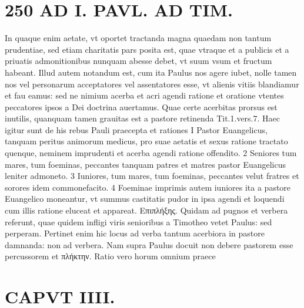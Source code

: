 \documentclass{article}
\begin{document}
\begin{pages}
\section*{250 AD I. PAVL. AD TIM. }\pstart In quaque enim aetate, vt oportet tractanda magna quaedam non tantum prudentiae, sed etiam charitatis pars posita est, quae vtraque et a publicis et a priuatis admonitionibus nunquam abesse debet, vt suum vsum et fructum habeant. Illud autem notandum est, cum ita Paulus nos agere iubet, nolle tamen nos vel personarum acceptatores vel assentatores esse, vt alienis vitiis blandiamur et fau eamus: sed ne nimium acerba et acri agendi ratione et oratione vtentes peccatores ipsos a Dei doctrina auertamus. Quae certe acerbitas prorsus est inutilis, quanquam tamen grauitas est a pastore retinenda Tit.1.vers.7. Haec igitur sunt de his rebus Pauli praecepta et rationes I Pastor Euangelicus, tanquam peritus animorum medicus, pro suae aetatis et sexus ratione tractato quenque, neminem imprudenti et acerba agendi ratione offendito. 2 Seniores tum mares, tum foeminas, peccantes tanquam patres et matres pastor Euangelicus leniter admoneto. 3 Iuniores, tum mares, tum foeminas, peccantes velut fratres et sorores idem commonefacito. 4 Foeminae imprimis autem iuniores ita a pastore Euangelico moneantur, vt summus castitatis pudor in ipsa agendi et loquendi cum illis ratione eluceat et appareat. Επιπλήξης. Quidam ad pugnos et verbera referunt, quae quidem infligi viris senioribus a Timotheo vetet Paulus: sed perperam. Pertinet enim hic locus ad verba tantum acerbiora in pastore damnanda: non ad verbera. Nam supra Paulus docuit non debere pastorem esse percussorem et πλήκτην. Ratio vero horum omnium praece\pend
\section*{CAPVT  IIII. }
\marginpar{[ p.251 ]}\pstart {}
{}

\end{pages}
\end{document}
